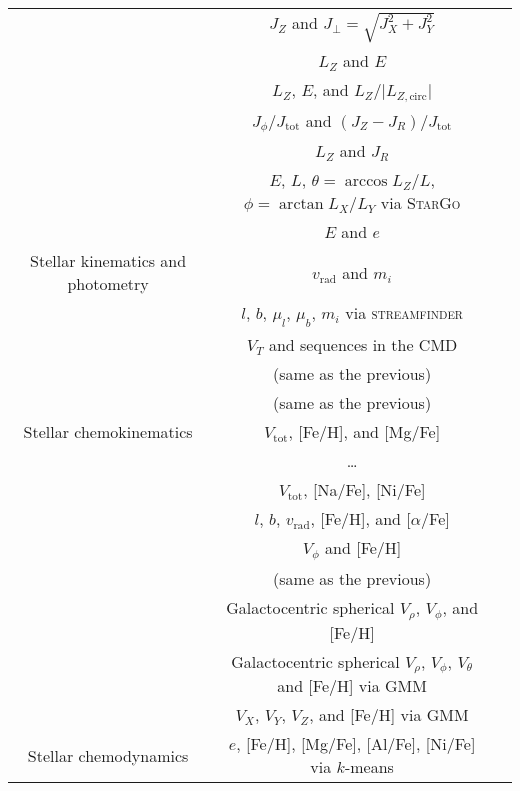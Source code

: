 \begin{table*}
\begin{tabular}{c|c|c}
        & $J_Z$ and $J_\perp = \sqrt{J_X^2 + J_Y^2}$ & \citet{Helmi1999} \\
        & $L_Z$ and $E$ & \citet{Helmi2017, Helmi2018} \\
        & $L_Z$, $E$, and $L_Z/\vert L_{Z,\text{circ}} \vert$ & \citet{Koppelman2019} \\
        & $J_\phi / J_\text{tot}$ and $(J_Z - J_R) / J_\text{tot}$ & \citet{Myeong2019} \\
        & $L_Z$ and $J_R$ & \citet{Feuillet2020} \\
        & $E$, $L$, $\theta = \arccos{L_Z/L}$, $\phi = \arctan{L_X/L_Y}$ via \textsc{StarGo} & \citet{Yuan2020} \\
        & $E$ and $e$ & \citet{Horta2021} \\
        \hline
        Stellar kinematics and photometry & $v_\text{rad}$ and $m_i$ & \citet{Ibata1994} \\
        & $l$, $b$, $\mu_l$, $\mu_b$, $m_i$ via \textsc{streamfinder} & \citet{Malhan2018} \\
        & $V_T$ and sequences in the CMD & \citet{Babusiaux2018} \\
        & (same as the previous) & \citet{Haywood2018b} \\
        & (same as the previous) & \citet{Gallart2019} \\
        \hline
        Stellar chemokinematics & $V_\text{tot}$, [Fe/H], and [Mg/Fe] & \citet{Nissen2010} \\
        & \dots & \citet{Navarro2011} \\
        & $V_\text{tot}$, [Na/Fe], [Ni/Fe] & \citet{Bensby2014} \\
        & $l$, $b$, $v_\text{rad}$, [Fe/H], and [$\alpha$/Fe] & \citet{Hawkins2015} \\
        & $V_\phi$ and [Fe/H] & \citet{Belokurov2020} \\
        & (same as the previous) & \citet{An2021b} \\
        & Galactocentric spherical $V_\rho$, $V_\phi$, and [Fe/H] & \citet{Belokurov2018} \\
        & Galactocentric spherical $V_\rho$, $V_\phi$, $V_\theta$ and [Fe/H] via GMM & \citet{Myeong2018c} \\
        & $V_X$, $V_Y$, $V_Z$, and [Fe/H] via GMM & \citet{Nikakhtar2021} \\
        \hline
        Stellar chemodynamics & $e$, [Fe/H], [Mg/Fe], [Al/Fe], [Ni/Fe] via $k$-means & \citet{Mackereth2019} \\

\end{tabular}
\end{table*}
